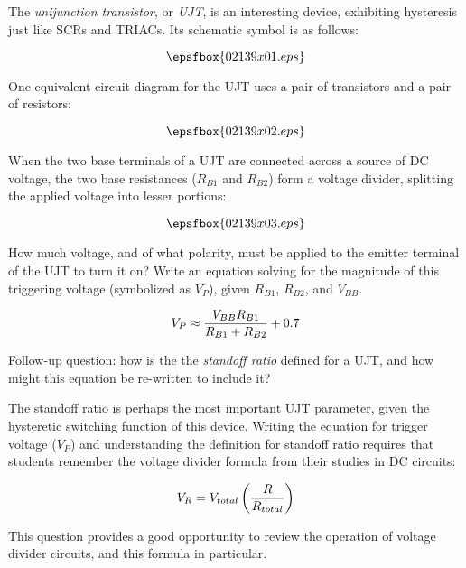 

The {\it unijunction transistor}, or {\it UJT}, is an interesting device, exhibiting hysteresis just like SCRs and TRIACs.  Its schematic symbol is as follows:

$$\epsfbox{02139x01.eps}$$

One equivalent circuit diagram for the UJT uses a pair of transistors and a pair of resistors:

$$\epsfbox{02139x02.eps}$$

When the two base terminals of a UJT are connected across a source of DC voltage, the two base resistances ($R_{B1}$ and $R_{B2}$) form a voltage divider, splitting the applied voltage into lesser portions:

$$\epsfbox{02139x03.eps}$$

How much voltage, and of what polarity, must be applied to the emitter terminal of the UJT to turn it on?  Write an equation solving for the magnitude of this triggering voltage (symbolized as $V_P$), given $R_{B1}$, $R_{B2}$, and $V_{BB}$.







$$V_P \approx {{V_{BB} R_{B1}} \over {R_{B1} + R_{B2}}} + 0.7$$

\vskip 10pt

Follow-up question: how is the the {\it standoff ratio} defined for a UJT, and how might this equation be re-written to include it?







The standoff ratio is perhaps the most important UJT parameter, given the hysteretic switching function of this device.  Writing the equation for trigger voltage ($V_P$) and understanding the definition for standoff ratio requires that students remember the voltage divider formula from their studies in DC circuits:

$$V_R = V_{total} \left( {R \over R_{total}} \right)$$

This question provides a good opportunity to review the operation of voltage divider circuits, and this formula in particular.




